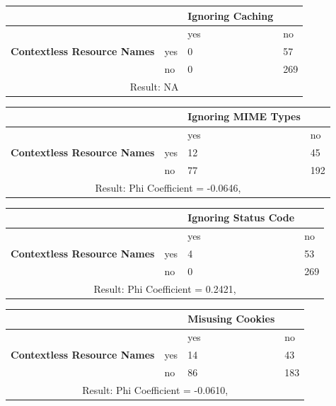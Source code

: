 \documentclass[a4paper,12pt]{article}
\begin{document}
\begin{center}
  \begin{tabular}{| p{60mm} | p{10mm} | p{35mm} | p{35mm} |}
  \hline
   & & \textbf{Ignoring Caching} &
  \\
  \hline
  & & yes & no
  \\
  \hline
  \textbf{Contextless Resource Names} & yes & 0 & 57
  \\
  \hline
   & no & 0 & 269
  \\
  \hline
  \multicolumn{4}{|c|}{Result: NA}
  \\ \hline
  \end{tabular}
  \end{center}

\begin{center}
  \begin{tabular}{| p{60mm} | p{10mm} | p{35mm} | p{35mm} |}
  \hline
   & & \textbf{Ignoring MIME Types} &
  \\
  \hline
  & & yes & no
  \\
  \hline
  \textbf{Contextless Resource Names} & yes & 12 & 45
  \\
  \hline
   & no & 77 & 192
  \\
  \hline
  \multicolumn{4}{|c|}{Result: Phi Coefficient = -0.0646, }
  \\ \hline
  \end{tabular}
  \end{center}

\begin{center}
  \begin{tabular}{| p{60mm} | p{10mm} | p{35mm} | p{35mm} |}
  \hline
   & & \textbf{Ignoring Status Code} &
  \\
  \hline
  & & yes & no
  \\
  \hline
  \textbf{Contextless Resource Names} & yes & 4 & 53
  \\
  \hline
   & no & 0 & 269
  \\
  \hline
  \multicolumn{4}{|c|}{Result: Phi Coefficient = 0.2421, }
  \\ \hline
  \end{tabular}
  \end{center}

\begin{center}
  \begin{tabular}{| p{60mm} | p{10mm} | p{35mm} | p{35mm} |}
  \hline
   & & \textbf{Misusing Cookies} &
  \\
  \hline
  & & yes & no
  \\
  \hline
  \textbf{Contextless Resource Names} & yes & 14 & 43
  \\
  \hline
   & no & 86 & 183
  \\
  \hline
  \multicolumn{4}{|c|}{Result: Phi Coefficient = -0.0610, }
  \\ \hline
  \end{tabular}
  \end{center}
\end{document}
